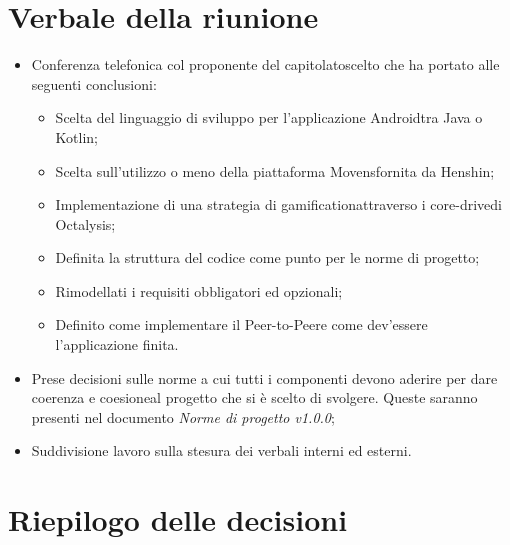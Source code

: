 \section{Verbale della riunione}
\begin{itemize}
	\item Conferenza telefonica col proponente del capitolato\glosp scelto che ha portato alle seguenti conclusioni:
	\begin{itemize}
		\item Scelta del linguaggio di sviluppo per l'applicazione Android\glosp tra Java o Kotlin\glo;
		\item Scelta sull'utilizzo o meno della piattaforma Movens\glosp fornita da Henshin\glo;
		\item Implementazione di una strategia di gamification\glosp attraverso i core-drive\glosp di Octalysis\glo;
		\item Definita la struttura del codice come punto per le norme di progetto;
		\item Rimodellati i requisiti obbligatori ed opzionali;
		\item Definito come implementare il Peer-to-Peer\glosp e come dev'essere l'applicazione finita.   
	\end{itemize}
	\item Prese decisioni sulle norme a cui tutti i componenti devono aderire per dare coerenza e coesione\glosp al progetto che
	si è scelto di svolgere. Queste saranno presenti nel documento \textit{Norme di progetto v1.0.0};
	\item Suddivisione lavoro sulla stesura dei verbali interni ed esterni. 
\end{itemize}
\pagebreak
\section{Riepilogo delle decisioni}

	
